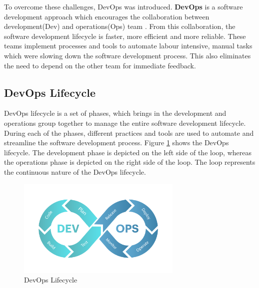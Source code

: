 To overcome these challenges, DevOps was introduced. \textbf{DevOps} is a software development approach which encourages the collaboration between development(Dev) 
and operations(Ops) team \cite{10616918}. From this collaboration, the software development lifecycle is faster, more efficient and more reliable. These teams 
implement processes and tools to automate labour intensive, manual tasks which were slowing down the software development process. This also eliminates the 
need to depend on the other team for immediate feedback. 


\subsection{DevOps Lifecycle}
DevOps lifecycle is a set of phases, which brings in the development and operations group together to manage the entire software development lifecycle.
During each of the phases, different practices and tools are used to automate and streamline the software development process. Figure \ref{devops_lifecycle} shows 
the DevOps lifecycle. The development phase is depicted on the left side of the loop, whereas the operations phase is depicted on the right side of the loop. 
The loop represents the continuous nature of the DevOps lifecycle.
\begin{figure}[!ht]
    \centering
    \includegraphics[width=0.7\textwidth]{Images/DevOps-Life-Cycle.pdf}
    \caption{DevOps Lifecycle \cite{devops_lifecycle}}
    \label{devops_lifecycle}
\end{figure}

